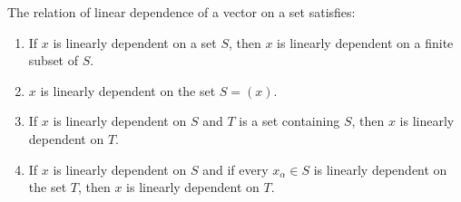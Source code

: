 The relation of linear dependence of a vector on a set satisfies:
\begin{enumerate}
\item If $x$ is linearly dependent on a set $S$, then $x$ is linearly dependent on a finite subset of $S$.
\item $x$ is linearly dependent on the set $S = (x)$.
\item If $x$ is linearly dependent on $S$ and $T$ is a set containing $S$, then $x$ is linearly dependent on $T$.
\item If $x$ is linearly dependent on $S$ and if every $x_\alpha \in S$ is linearly dependent on the set $T$, then $x$ is linearly dependent on $T$.
\end{enumerate}
